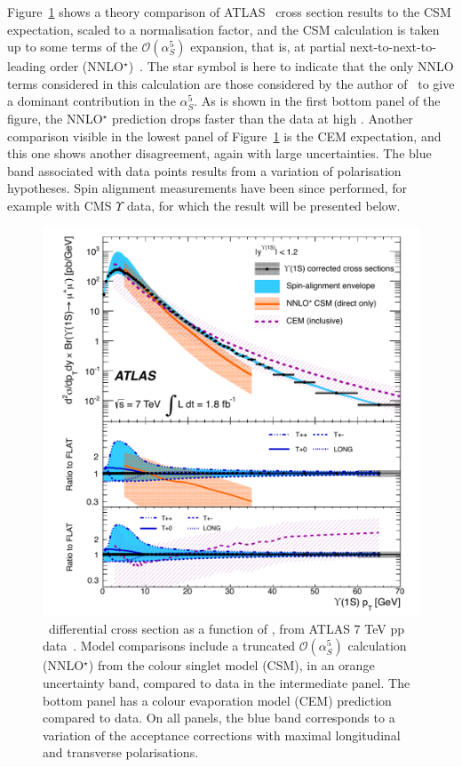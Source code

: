 Figure~\ref{fig:atlasNNLO} shows a theory comparison of ATLAS \PgUa~cross section results to the CSM
expectation, scaled to a normalisation factor, and the
CSM calculation is taken up to some terms of the
$\mathcal{O}(\alpha_{S}^{5})$ expansion, that is,
at partial next-to-next-to-leading order
(NNLO$^{\star}$)~\cite{LansbergNNLO}. The star symbol is 
here to indicate that the only NNLO terms considered in this
calculation are those considered by the author of~\cite{LansbergNNLO}
to give a dominant contribution in the $\alpha_{S}^{5}$. As is shown
in the first
bottom panel of the figure, the NNLO$^{\star}$ prediction drops faster
than the data at high \pt. Another
comparison visible in the lowest panel of Figure~\ref{fig:atlasNNLO}
is the CEM expectation, and this one shows another disagreement, again
with large uncertainties. The blue band associated with data points
results from a variation of polarisation hypotheses. Spin
alignment measurements have been since performed, for example with CMS
$\Upsilon$ data, for which the result will be presented below.
\\
\begin{figure}
\begin{center}
  \includegraphics[height=0.4\textheight]{Chapters/pQuarkonia/AtlasUpsiPt.pdf}
  \caption{\PgUa~differential cross section as a function of \pt, from
    ATLAS 7 TeV pp data~\cite{atlasUpsilon7tev}. Model comparisons
    include a truncated $\mathcal{O}(\alpha_{S}^{5})$ calculation
    (NNLO$^{\star}$) from the colour singlet model (CSM), in an orange
    uncertainty band, compared to data in the intermediate panel. The
    bottom panel has a colour evaporation model (CEM) prediction compared to
    data. On all panels, the blue band corresponds to a variation of
    the acceptance corrections with maximal longitudinal and transverse polarisations.}
  \label{fig:atlasNNLO}
\end{center}
\end{figure}



